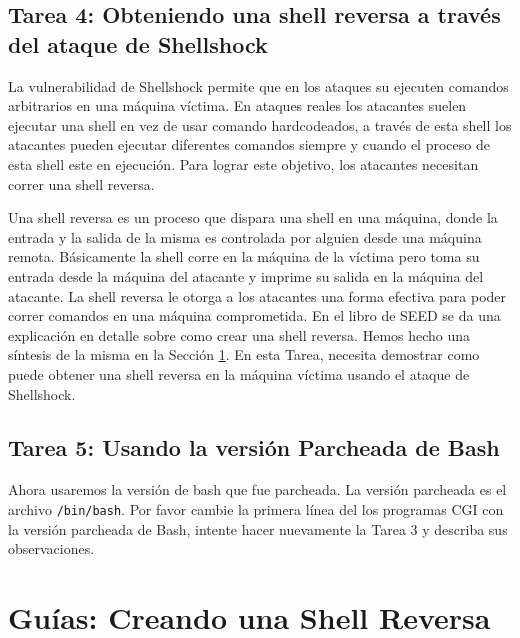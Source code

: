\subsection{Tarea 4: Obteniendo una shell reversa a través del ataque de Shellshock }

La vulnerabilidad de Shellshock permite que en los ataques su ejecuten comandos arbitrarios en una máquina víctima. En ataques reales los atacantes suelen ejecutar una shell en vez de usar comando hardcodeados, a través de esta shell los atacantes pueden ejecutar diferentes comandos siempre y cuando el proceso de esta shell este en ejecución.
Para lograr este objetivo, los atacantes necesitan correr una shell reversa.

Una shell reversa es un proceso que dispara una shell en una máquina, donde la entrada y la salida de la misma es controlada por alguien desde una máquina remota. Básicamente la shell corre en la máquina de la víctima pero toma su entrada desde la máquina del atacante y imprime su salida en la máquina del atacante. La shell reversa le otorga a los atacantes una forma efectiva para poder correr comandos en una máquina comprometida.
En el libro de SEED se da una explicación en detalle sobre como crear una shell reversa. Hemos hecho una síntesis de la misma en la Sección \ref{shellshock:sec:reverseshell}.
En esta Tarea, necesita demostrar como puede obtener una shell reversa en la máquina víctima usando el ataque de Shellshock.

\subsection{Tarea 5: Usando la versión Parcheada de Bash}

Ahora usaremos la versión de bash que fue parcheada. La versión parcheada es el archivo \texttt{/bin/bash}.
Por favor cambie la primera línea del los programas CGI con la versión parcheada de Bash, intente hacer nuevamente la Tarea 3 y describa sus observaciones.


\section{Guías: Creando una Shell Reversa}
\label{shellshock:sec:reverseshell}






